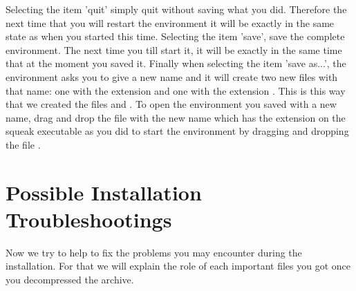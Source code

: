 Selecting the item 'quit' simply quit without saving what you did. Therefore the next time that you will restart the environment it will be exactly in the same state as when you started this time. Selecting the item 'save', save the complete environment. The next time you till start it, it will be exactly in the same time that at the moment you saved it. 
Finally when selecting the item 'save as...',  the environment asks you to give a new name and it will create two new files with that name: one with the extension  and one with the extension .  This is this way that we created the files  and .  To open the environment you saved with a new name, drag and drop the file with the new name which has the extension  on the squeak executable as you did to start the environment by dragging and dropping the file .





\section{Possible Installation Troubleshootings}\label{sec:trouble}
Now we try to help to fix the problems you may encounter during the installation. For that we will explain the role of each important files you got once you decompressed the archive.

